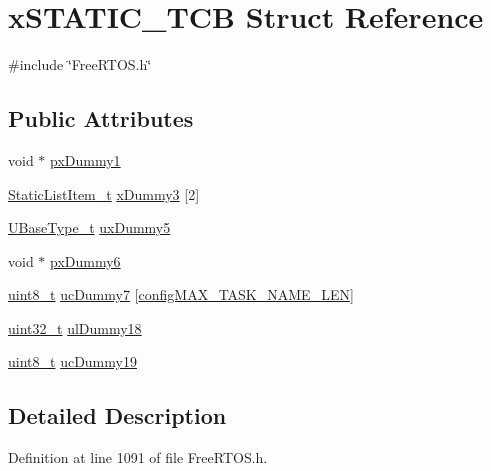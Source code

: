 \hypertarget{structxSTATIC__TCB}{}\section{x\+S\+T\+A\+T\+I\+C\+\_\+\+T\+CB Struct Reference}
\label{structxSTATIC__TCB}


{\ttfamily \#include \char`\"{}Free\+R\+T\+O\+S.\+h\char`\"{}}

\subsection*{Public Attributes}
\begin{DoxyCompactItemize}
\item 
void $\ast$ \hyperlink{structxSTATIC__TCB_a2f66b620fdeb13f8969f27e1bbb4d1d1}{px\+Dummy1}
\item 
\hyperlink{FreeRTOS_8h_a1d31bc0472385a87424518da484d9e09}{Static\+List\+Item\+\_\+t} \hyperlink{structxSTATIC__TCB_a7f182aa8f5003494f63d975dabcb3ec1}{x\+Dummy3} \mbox{[}2\mbox{]}
\item 
\hyperlink{pic32mx_2portmacro_8h_a646f89d4298e4f5afd522202b11cb2e6}{U\+Base\+Type\+\_\+t} \hyperlink{structxSTATIC__TCB_ab950bb498901ef7291e49086e5a2efd0}{ux\+Dummy5}
\item 
void $\ast$ \hyperlink{structxSTATIC__TCB_a416495e152e5caef64994f72329c60b0}{px\+Dummy6}
\item 
\hyperlink{stdint_8h_aba7bc1797add20fe3efdf37ced1182c5}{uint8\+\_\+t} \hyperlink{structxSTATIC__TCB_a308771ccd6723cad777695d84a0a2a30}{uc\+Dummy7} \mbox{[}\hyperlink{FreeRTOS_8h_ac388dc4041aab6997348828eb27fc1a8}{config\+M\+A\+X\+\_\+\+T\+A\+S\+K\+\_\+\+N\+A\+M\+E\+\_\+\+L\+EN}\mbox{]}
\item 
\hyperlink{stdint_8h_a435d1572bf3f880d55459d9805097f62}{uint32\+\_\+t} \hyperlink{structxSTATIC__TCB_ade6781276f913dcd592ee0f6cce76c7e}{ul\+Dummy18}
\item 
\hyperlink{stdint_8h_aba7bc1797add20fe3efdf37ced1182c5}{uint8\+\_\+t} \hyperlink{structxSTATIC__TCB_aa98151056a161f180013ae36dae0d17b}{uc\+Dummy19}
\end{DoxyCompactItemize}


\subsection{Detailed Description}


Definition at line 1091 of file Free\+R\+T\+O\+S.\+h.



